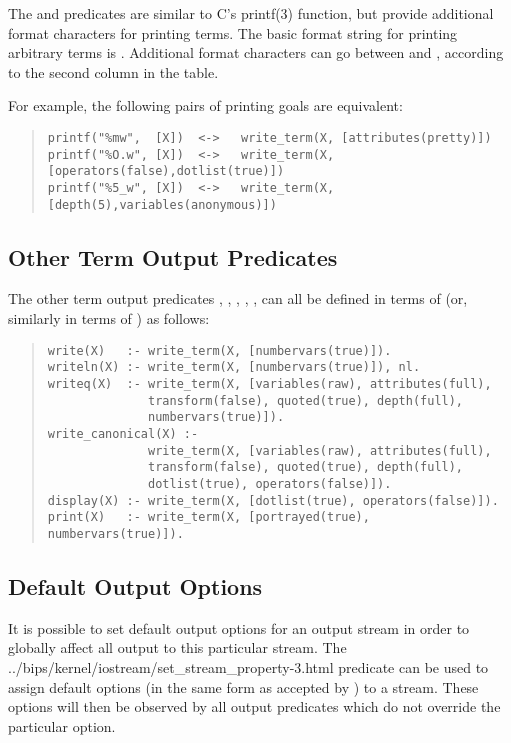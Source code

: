 The
 and
predicates are similar to C's printf(3) function, but provide
additional format characters for printing {\eclipse} terms.
The basic format string for printing arbitrary terms is .
Additional format characters can go between \notation{\%} and ,
according to the second column in the table.

For example, the following pairs of printing goals are equivalent:
\begin{quote}
\begin{verbatim}
printf("%mw",  [X])  <->   write_term(X, [attributes(pretty)])
printf("%O.w", [X])  <->   write_term(X, [operators(false),dotlist(true)])
printf("%5_w", [X])  <->   write_term(X, [depth(5),variables(anonymous)])
\end{verbatim}
\end{quote}


\subsection{Other Term Output Predicates}

The other term output predicates
,
,
,
,
,
can all be defined in terms of  (or, similarly
in terms of ) as follows:
\begin{quote}
\begin{verbatim}
write(X)   :- write_term(X, [numbervars(true)]).
writeln(X) :- write_term(X, [numbervars(true)]), nl.
writeq(X)  :- write_term(X, [variables(raw), attributes(full),
              transform(false), quoted(true), depth(full),
              numbervars(true)]).
write_canonical(X) :-
              write_term(X, [variables(raw), attributes(full),
              transform(false), quoted(true), depth(full),
              dotlist(true), operators(false)]).
display(X) :- write_term(X, [dotlist(true), operators(false)]).
print(X)   :- write_term(X, [portrayed(true), numbervars(true)]).
\end{verbatim}
\end{quote}


\subsection{Default Output Options}

It is possible to set default output options for an output stream
in order to globally affect all output to this particular stream.
The
%
{../bips/kernel/iostream/set_stream_property-3.html}
predicate can be used to assign default options (in the same form as
accepted by ) to a stream.
These options will then be observed by all output predicates which do not
override the particular option.

